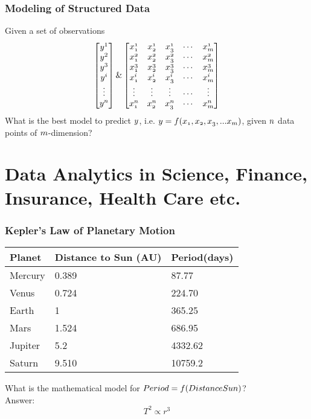 \documentclass[notheorems, aspectratio=54]{beamer}
\begin{document}
\begin{frame}
\frametitle{Modeling of Structured Data}
Given a set of observations
\[ \begin{bmatrix}  \mathnormal{y}^1 \\ \mathnormal{y}^2\\\mathnormal{y}^3\\\mathnormal{y^i} \\ \vdots \\\mathnormal{y^n} \end{bmatrix}
\&
\begin{bmatrix}
   \mathnormal{x^1_1} &\mathnormal{x^1_2}  &\mathnormal{x^1_3} & \cdots &\mathnormal{x^1_m}\\
   \mathnormal{x^2_1} &\mathnormal{x^2_2} &\mathnormal{x^2_3} & \cdots &\mathnormal{x^2_m}\\
   \mathnormal{x^3_1} &\mathnormal{x^3_2} &\mathnormal{x^3_3} & \cdots &\mathnormal{x^3_m}\\
   \mathnormal{x^i_1} &\mathnormal{x^i_2} &\mathnormal{x^i_3} & \cdots &\mathnormal{x^i_m}\\
   \vdots &\vdots &\vdots & \cdots &\vdots\\
   \mathnormal{x^n_1} &\mathnormal{x^n_2} &\mathnormal{x^n_3} &\cdots &\mathnormal{x^n_m}
  \end{bmatrix}
\]
What is the best model to predict $\mathnormal{y}$, i.e. $\mathnormal{y}=\mathnormal{f(x_1, x_2, x_3,  ... x_m)}$, given $\mathnormal{n}$ data points of $\mathnormal{m}$-dimension?
\end{frame}


\section{Data Analytics in Science, Finance, Insurance, Health Care etc.}

\begin{frame}
\frametitle{Kepler's Law of Planetary Motion}
\begin{table}[]
\begin{tabular}{lll}
Planet &Distance to Sun (AU) &Period(days)\\
\hline
Mercury	&0.389	&87.77\\
Venus	&0.724	&224.70\\
Earth	&1	&365.25\\
Mars	&1.524	&686.95\\
Jupiter	&5.2	&4332.62\\
Saturn	&9.510	&10759.2\\
\hline
\end{tabular}
\end{table}
What is the mathematical model for $Period=\mathnormal{f}(DistanceSun)$?\\
Answer: $$T^2 \propto r^3$$
\end{frame}
\end{document}
